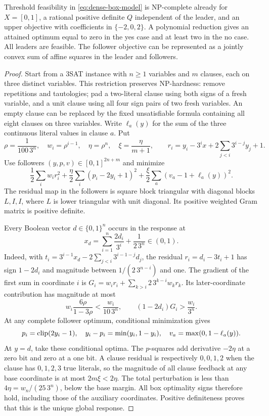 \begin{theorem}\label{thm:dense-hardness}
Threshold feasibility in \eqref{eq:dense-box-model} is NP-complete already for
\(X=[0,1]\), a rational positive definite \(Q\) independent of the leader, and an upper objective
with coefficients in \(\{-2,0,2\}\). A polynomial reduction gives an attained
optimum equal to zero in the yes case and at least two in the no case. All
leaders are feasible. The follower objective can be represented as a jointly
convex sum of affine squares in the leader and followers.
\end{theorem}
\begin{proof}
Start from a 3SAT instance with \(n\ge1\) variables and \(m\) clauses, each on
three distinct variables. This restriction preserves NP-hardness: remove
repetitions and tautologies; pad a two-literal clause using both signs of a
fresh variable, and a unit clause using all four sign pairs of two fresh
variables. An empty clause can be replaced by the fixed unsatisfiable formula
containing all eight clauses on three variables. Write \(\ell_a(y)\) for the
sum of the three continuous literal values in clause \(a\).
Put
\[
 \rho=\frac1{100\,3^n},\quad w_i=\rho^{i-1},\quad
 \eta=\rho^n,\quad \xi=\frac\eta{m+1},\qquad
 r_i=y_i-3^ix+2\sum_{j<i}3^{i-j}y_j+1.
\]
Use followers \((y,p,v)\in[0,1]^{2n+m}\) and minimize
\begin{equation}\label{eq:dense-square-gadget}
 \frac12\sum_iw_ir_i^2+
 \frac\eta2\sum_i(p_i-2y_i+1)^2+
 \frac\xi2\sum_a(v_a-1+\ell_a(y))^2.
\end{equation}
The residual map in the followers is square block triangular with diagonal
blocks \(L,I,I\), where \(L\) is lower triangular with unit diagonal.
Its positive weighted Gram matrix is positive definite.

Every Boolean vector \(d\in\{0,1\}^n\) occurs in the response at
\[
 x_d=\sum_{i=1}^n\frac{2d_i}{3^i}+\frac1{2\,3^n}\in(0,1).
\]
Indeed, with \(t_i=3^{i-1}x_d-2\sum_{j<i}3^{i-1-j}d_j\), the residual
\(r_i=d_i-3t_i+1\) has sign \(1-2d_i\) and magnitude between
\(1/(2\,3^{n-i})\) and one. The gradient of the first sum in coordinate \(i\)
is \(G_i=w_ir_i+\sum_{k>i}2\,3^{k-i}w_kr_k\). Its later-coordinate contribution
has magnitude at most
\[
 w_i\frac{6\rho}{1-3\rho}<\frac{w_i}{10\,3^n},
 \qquad (1-2d_i)G_i>\frac{w_i}{3^n}.
\]
At any complete follower optimum, conditional minimization gives
\begin{equation}\label{eq:shortfall-readout}
 p_i=\operatorname{clip}(2y_i-1),\quad y_i-p_i=\min(y_i,1-y_i),\quad
 v_a=\max(0,1-\ell_a(y)).
\end{equation}
At \(y=d\), take these conditional optima. The \(p\)-squares add derivative
\(-2\eta\) at a zero bit and zero at a one bit. A clause residual is respectively
\(0,0,1,2\) when the clause has \(0,1,2,3\) true literals, so the magnitude of
all clause feedback at any base coordinate is at most \(2m\xi<2\eta\).
The total perturbation is less than
\(4\eta=w_n/(25\,3^n)\), below the base margin. All box optimality signs
therefore hold, including those of the auxiliary coordinates. Positive
definiteness proves that this is the unique global response.


\end{proof}
